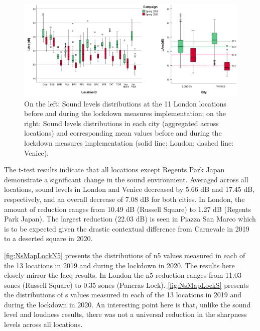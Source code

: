 \begin{figure}[h]
  \centering
  \includegraphics[width=\textwidth]{Figures/LockdownLAeqCombined.png}
  \caption{On the left: Sound levels distributions at the 11 London locations before and during the lockdown measures implementation; on the right: Sound levels distributions in each city (aggregated across locations) and corresponding mean values before and during the lockdown measures implementation (solid line: London; dashed line: Venice). \label{fig:NsMapLockLAeq}}
\end{figure}


The t-test results indicate that all locations except Regents Park Japan demonstrate a significant change in the sound environment. Averaged across all locations, sound levels in London and Venice decreased by 5.66 dB and 17.45 dB, respectively, and an overall decrease of 7.08 dB for both cities. In London, the amount of reduction ranges from 10.49 dB (Russell Square) to 1.27 dB (Regents Park Japan). The largest reduction (22.03 dB) is seen in Piazza San Marco which is to be expected given the drastic contextual difference from Carnevale in 2019 to a deserted square in 2020. 

\cref{fig:NsMapLockN5} presents the distributions of \gls{n5} values measured in each of the 13 locations in 2019 and during the lockdown in 2020. The results here closely mirror the \gls{laeq} results. In London the \gls{n5} reduction ranges from 11.03 sones (Russell Square) to 0.35 sones (Pancras Lock). \cref{fig:NsMapLockS} presents the distributions of \gls{s} values measured in each of the 13 locations in 2019 and during the lockdown in 2020. An interesting point here is that, unlike the sound level and loudness results, there was not a universal reduction in the sharpness levels across all locations.


